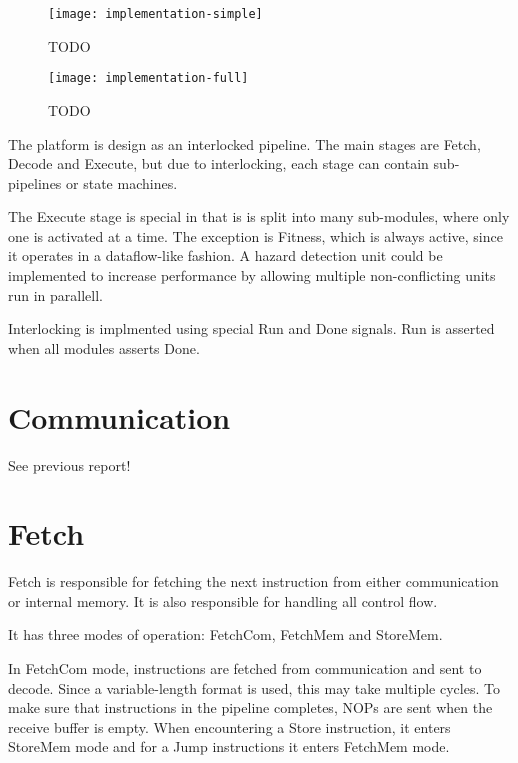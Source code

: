 \begin{figure}[!ht]
    \centering
    \texttt{[image: implementation-simple]}
    \caption{TODO}
    \label{fig:implementation-simple}
\end{figure}

\begin{figure}[!ht]
    \hspace{-0.1\textwidth}
    \texttt{[image: implementation-full]}
    \caption{TODO}
    \label{fig:implementation-full}
\end{figure}

The platform is design as an interlocked pipeline.
The main stages are Fetch, Decode and Execute, but due to interlocking, each stage can contain sub-pipelines or state machines.

The Execute stage is special in that is is split into many sub-modules, where only one is activated at a time.
The exception is Fitness, which is always active, since it operates in a dataflow-like fashion.
A hazard detection unit could be implemented to increase performance by allowing multiple non-conflicting units run in parallell.

Interlocking is implmented using special Run and Done signals.
Run is asserted when all modules asserts Done.

\section{Communication}

See previous report!

\section{Fetch}

Fetch is responsible for fetching the next instruction from either communication or internal memory.
It is also responsible for handling all control flow.

It has three modes of operation: FetchCom, FetchMem and StoreMem.

In FetchCom mode, instructions are fetched from communication and sent to decode.
Since a variable-length format is used, this may take multiple cycles.
To make sure that instructions in the pipeline completes, NOPs are sent when the receive buffer is empty.
When encountering a Store instruction, it enters StoreMem mode and for a Jump instructions it enters FetchMem mode.

